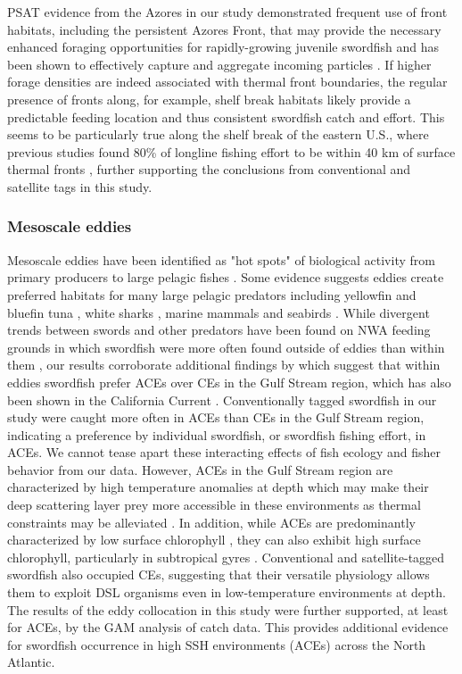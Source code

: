 PSAT evidence from the Azores in our study demonstrated frequent use of front habitats, including the persistent Azores Front, that may provide the necessary enhanced foraging opportunities for rapidly-growing juvenile swordfish and has been shown to effectively capture and aggregate incoming particles \citep{Sala2016}. If higher forage densities are indeed associated with thermal front boundaries, the regular presence of fronts along, for example, shelf break habitats likely provide a predictable feeding location and thus consistent swordfish catch and effort. This seems to be particularly true along the shelf break of the eastern U.S., where previous studies found 80\% of longline fishing effort to be within 40 km of surface thermal fronts \citep{Podesta1993}, further supporting the conclusions from conventional and satellite tags in this study.

\subsubsection{Mesoscale eddies}

Mesoscale eddies have been identified as "hot spots" of biological activity from primary producers \citep{McGillicuddy2007} to large pelagic fishes \citep{Hobday2014, GaubeWhiteSharks}. Some evidence suggests eddies create preferred habitats for many large pelagic predators including yellowfin and bluefin tuna \citep{Teo2007, Hsu2015}, white sharks \citep{GaubeWhiteSharks}, marine mammals \citep{Bailleul2010} and seabirds \citep{TewKai2009}. While divergent trends between swords and other predators have been found on NWA feeding grounds in which swordfish were more often found outside of eddies than within them \citep{Hsu2015}, our results corroborate additional findings by \citet{Hsu2015} which suggest that within eddies swordfish prefer ACEs over CEs in the Gulf Stream region, which has also been shown in the California Current \citep{Scales2017}. Conventionally tagged swordfish in our study were caught more often in ACEs than CEs in the Gulf Stream region, indicating a preference by individual swordfish, or swordfish fishing effort, in ACEs. We cannot tease apart these interacting effects of fish ecology and fisher behavior from our data. However, ACEs in the Gulf Stream region are characterized by high temperature anomalies at depth which may make their deep scattering layer prey more accessible in these environments as thermal constraints may be alleviated \citep{GaubeWhiteSharks}. In addition, while ACEs are predominantly characterized by low surface chlorophyll \citep{Gaube2014}, they can also exhibit high surface chlorophyll, particularly in subtropical gyres \citep{Dufois2016}. Conventional and satellite-tagged swordfish also occupied CEs, suggesting that their versatile physiology allows them to exploit DSL organisms even in low-temperature environments at depth. The results of the eddy collocation in this study were further supported, at least for ACEs, by the GAM analysis of catch data. This provides additional evidence for swordfish occurrence in high SSH environments (ACEs) across the North Atlantic.

